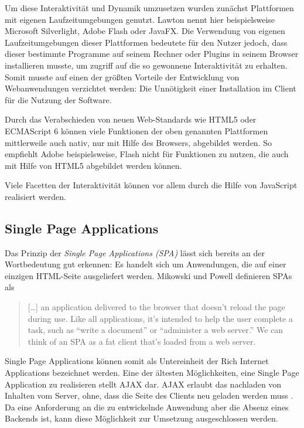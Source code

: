 Um diese Interaktivität und Dynamik umzusetzen wurden zunächst Plattformen mit eigenen Laufzeitumgebungen genutzt. Lawton \cite{lawton2008new} nennt hier beispielsweise Microsoft Silverlight, Adobe Flash oder JavaFX.
Die Verwendung von eigenen Laufzeitumgebungen dieser Plattformen  bedeutete für den Nutzer jedoch,  dass dieser bestimmte Programme auf seinem Rechner oder Plugins in seinem Browser installieren musste, um zugriff auf die so gewonnene Interaktivität zu erhalten. Somit musste auf einen der größten Vorteile der Entwicklung von Webanwendungen verzichtet werden: Die Unnötigkeit einer Installation im Client für die Nutzung der Software.

Durch das Verabschieden von neuen Web-Standards wie HTML5 oder ECMAScript 6 können viele Funktionen der oben genannten Plattformen mittlerweile auch nativ, nur mit Hilfe des Browsers, abgebildet werden. So empfiehlt Adobe beispielsweise, Flash nicht für Funktionen zu nutzen, die auch mit Hilfe von HTML5 abgebildet werden können\footnotemark{}.


Viele Facetten der Interaktivität können vor allem durch die Hilfe von JavaScript realisiert werden.

\subsection{Single Page Applications}
Das Prinzip der \textit{Single Page Applications (SPA)} lässt sich bereits an der Wortbedeutung gut erkennen: Es handelt sich um Anwendungen, die auf einer einzigen HTML-Seite ausgeliefert werden.
Mikowski und Powell definieren SPAs als

\begin{quote}
  […] an application delivered to the browser that doesn’t reload the page during use. Like all applications, it’s intended to help the user complete a task, such as “write a document” or “administer a web server.” We can think of an SPA as a fat client that’s loaded from a web server. \cite{MikowskiPowell201309}
\end{quote}

Single Page Applications können somit als Untereinheit der Rich Internet Applications bezeichnet werden.
Eine der ältesten Möglichkeiten, eine Single Page Application zu realisieren stellt AJAX dar. AJAX erlaubt das nachladen von Inhalten  vom Server, ohne, dass die Seite des Clients neu geladen werden muss \cite{paulson2005building}. Da eine Anforderung an die zu entwickelnde Anwendung aber die Absenz eines Backends ist, kann diese Möglichkeit zur Umsetzung ausgeschlossen werden.

